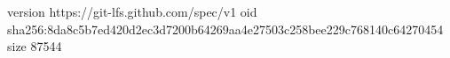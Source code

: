 version https://git-lfs.github.com/spec/v1
oid sha256:8da8c5b7ed420d2ec3d7200b64269aa4e27503c258bee229c768140c64270454
size 87544
